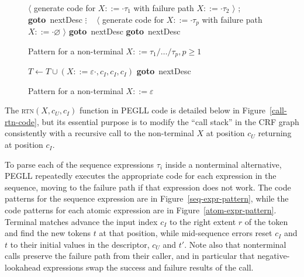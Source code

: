 \documentclass{article}
\newcommand{\fail}{\mathsf{fail}}
\newcommand{\Goto}[1]{\textbf{goto}~#1}
\begin{document}
\begin{figure}
\caption[Non-terminal code pattern]{Pattern for a non-terminal $X ::= \tau_1 / \ldots / \tau_p, p \geq 1$} \label{nt-pattern}
\begin{algorithmic}
	\State $\langle$ generate code for $X ::= \cdot \tau_1$ with failure path $X ::= \cdot \tau_2$ $\rangle$
	\State {}; \Goto{nextDesc}
\EndCase
\State $\vdots$
\State ~
	\State $\langle$ generate code for $X ::= \cdot \tau_p$ with failure path $X ::= \cdot \varnothing$ $\rangle$
	\State {} \Goto{nextDesc}
\EndCase
{}
	\State \Call{rtn}{$X$, $c_U$, $\fail$} \Goto{nextDesc}
\EndCase
\end{algorithmic}
\end{figure}

\begin{figure}
\caption[Empty non-terminal code pattern]{Pattern for a non-terminal $X ::= \varepsilon$} \label{empty-nt-pattern}
\begin{algorithmic}
	\State $T \gets T \cup {(X ::= \varepsilon \cdot, c_I, c_I, c_I)}$
	\State {} \Goto{nextDesc}
\EndCase
\end{algorithmic}
\end{figure}

The \textsc{rtn}$(X, c_U, c_I)$ function in PEGLL code is detailed below in Figure~\ref{call-rtn-code}, but its essential purpose is to modify the ``call stack'' in the CRF graph consistently with a recursive call to the non-terminal $X$ at position $c_U$ returning at position $c_I$.

To parse each of the sequence expressions $\tau_i$ inside a nonterminal alternative, PEGLL repeatedly executes the appropriate code for each expression in the sequence, moving to the failure path if that expression does not work. 
The code patterns for the sequence expression are in Figure~\ref{seq-expr-pattern}, while the code patterns for each atomic expression are in Figure~\ref{atom-expr-pattern}. 
Terminal matches advance the input index $c_I$ to the right extent $r$ of the token and find the new tokens $t$ at that position, while mid-sequence errors reset $c_I$ and $t$ to their initial values in the descriptor, $c_U$ and $t'$.
Note also that nonterminal calls preserve the failure path from their caller, and in particular that negative-lookahead expressions swap the success and failure results of the call.
\end{document}
